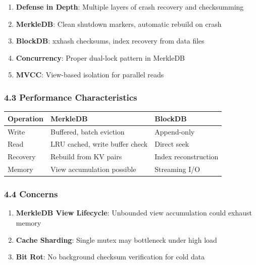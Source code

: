 \documentclass[
]{article}
\newcounter{none} %
\providecommand{\tightlist}{%
  \setlength{\itemsep}{0pt}\setlength{\parskip}{0pt}}
\begin{document}
\begin{enumerate}
\def\labelenumi{\arabic{enumi}.}
\tightlist
\item
  \textbf{Defense in Depth}: Multiple layers of crash recovery and
  checksumming
\item
  \textbf{MerkleDB}: Clean shutdown markers, automatic rebuild on crash
\item
  \textbf{BlockDB}: xxhash checksums, index recovery from data files
\item
  \textbf{Concurrency}: Proper dual-lock pattern in MerkleDB
\item
  \textbf{MVCC}: View-based isolation for parallel reads
\end{enumerate}

\subsubsection{4.3 Performance
Characteristics}\label{43-performance-characteristics}

{\def\LTcaptype{none} %
\begin{longtable}[]{@{}lll@{}}
\toprule\noalign{}
Operation & MerkleDB & BlockDB \\
\midrule\noalign{}
\endhead
\bottomrule\noalign{}
\endlastfoot
Write & Buffered, batch eviction & Append-only \\
Read & LRU cached, write buffer check & Direct seek \\
Recovery & Rebuild from KV pairs & Index reconstruction \\
Memory & View accumulation possible & Streaming I/O \\
\end{longtable}
}

\subsubsection{4.4 Concerns}\label{44-concerns}

\begin{enumerate}
\def\labelenumi{\arabic{enumi}.}
\tightlist
\item
  \textbf{MerkleDB View Lifecycle}: Unbounded view accumulation could
  exhaust memory
\item
  \textbf{Cache Sharding}: Single mutex may bottleneck under high load
\item
  \textbf{Bit Rot}: No background checksum verification for cold data
\end{enumerate}
\end{document}

